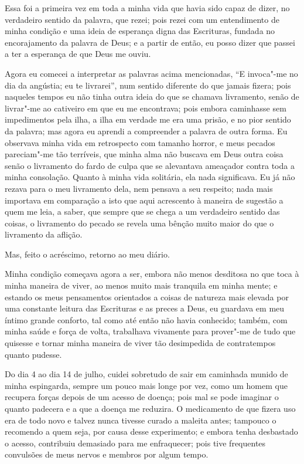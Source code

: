 Essa foi a primeira vez em toda a minha vida que havia sido capaz de
dizer, no verdadeiro sentido da palavra, que rezei; pois rezei com um
entendimento de minha condição e uma ideia de esperança digna das
Escrituras, fundada no encorajamento da palavra de Deus; e a partir de
então, eu posso dizer que passei a ter a esperança de que Deus me ouviu.

Agora eu comecei a interpretar as palavras acima mencionadas, ``E
invoca"-me no dia da angústia; eu te livrarei'', num sentido diferente do
que jamais fizera; pois naqueles tempos eu não tinha outra ideia do que
se chamava livramento, senão de livrar"-me ao cativeiro em que eu me
encontrava; pois embora caminhasse sem impedimentos pela ilha, a ilha em
verdade me era uma prisão, e no pior sentido da palavra; mas agora eu
aprendi a compreender a palavra de outra forma. Eu observava minha vida
em retrospecto com tamanho horror, e meus pecados pareciam"-me tão
terríveis, que minha alma não buscava em Deus outra coisa senão o
livramento do fardo de culpa que se alevantava ameaçador contra toda a
minha consolação. Quanto à minha vida solitária, ela nada significava.
Eu já não rezava para o meu livramento dela, nem pensava a seu respeito;
nada mais importava em comparação a isto que aqui acrescento à maneira
de sugestão a quem me leia, a saber, que sempre que se chega a um
verdadeiro sentido das coisas, o livramento do pecado se revela uma
bênção muito maior do que o livramento da aflição.

Mas, feito o acréscimo, retorno ao meu diário.

Minha condição começava agora a ser, embora não menos desditosa no que
toca à minha maneira de viver, ao menos muito mais tranquila em minha
mente; e estando os meus pensamentos orientados a coisas de natureza
mais elevada por uma constante leitura das Escrituras e as preces a
Deus, eu guardava em meu íntimo grande conforto, tal como até então não
havia conhecido; também, com minha saúde e força de volta, trabalhava
vivamente para prover"-me de tudo que quisesse e tornar minha maneira de
viver tão desimpedida de contratempos quanto pudesse.

Do dia 4 ao dia 14 de julho, cuidei sobretudo de sair em caminhada
munido de minha espingarda, sempre um pouco mais longe por vez, como um
homem que recupera forças depois de um acesso de doença; pois mal se
pode imaginar o quanto padecera e a que a doença me reduzira. O
medicamento de que fizera uso era de todo novo e talvez nunca tivesse
curado a maleita antes; tampouco o recomendo a quem seja, por causa
desse experimento; e embora tenha desbastado o acesso, contribuiu
demasiado para me enfraquecer; pois tive frequentes convulsões de meus
nervos e membros por algum tempo.

